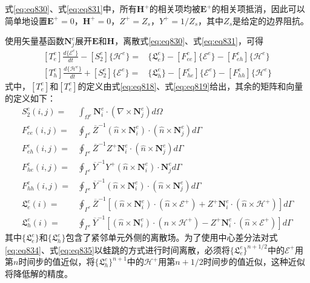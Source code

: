 \documentclass{article}
\numberwithin{equation}{section}
\renewcommand{\vec}[1]{\boldsymbol{#1}}
\begin{document}
式\ref{eq:eq830}、式\ref{eq:eq831}中，所有$\vec{\mathbf{H}}^+$的相关项均被$\vec{\mathbf{E}}^+$的相关项抵消，因此可以简单地设置$\vec{\mathbf{E}}^+=0$，$\vec{\mathbf{H}}^+=0$，$Z^+=Z_s$，$Y^+=1/Z_s$，其中$Z_s$是给定的边界阻抗。\par
使用矢量基函数$\mathbf{N}_j^e$展开$\vec{\mathbf{E}}$和$\vec{\mathbf{H}}$，离散式\ref{eq:eq830}、式\ref{eq:eq831}，可得
\begin{align}
    \label{eq:eq834}
    [T_e^e]\frac{d\{\mathcal{E}^e\}}{dt}-[S_2^e]\{\mathcal{H}^e\}=&\{\mathfrak{L}_e^e\}-[F^e_{ee}]\{\mathcal{E}^e\}-[F^e_{eh}]\{\mathcal{H}^e\} \\
    \label{eq:eq835}
    [T_h^e]\frac{d\{\mathcal{H}^e\}}{dt}+[S_2^e]\{\mathcal{E}^e\}=&\{\mathfrak{L}_h^e\}-[F^e_{he}]\{\mathcal{E}^e\}-[F^e_{hh}]\{\mathcal{H}^e\}
\end{align}
式中，$[T_e^e]$和$[T_e^e]$的定义由式\ref{eq:eq818}、式\ref{eq:eq819}给出，其余的矩阵和向量的定义如下：
\begin{align}
    \label{eq:eq836}
    S_2^e(i,j)=&\int_{\Omega^e}\mathbf{N}_i^e\cdot\left(\nabla\times\mathbf{N}_j^e\right)d\Omega \\
    \label{eq:eq837}
    F^e_{ee}(i,j)=&\oint_{\Gamma^e}\overline{Z}^{-1}(\hat{n}\times\mathbf{N}_i^e)\cdot(\hat{n}\times\mathbf{N}_j^e)d\Gamma \\
    \label{eq:eq838}
    F^e_{eh}(i,j)=&\oint_{\Gamma^e}\overline{Z}^{-1}Z^+\mathbf{N}_i^e\cdot(\hat{n}\times\mathbf{N}_j^e)d\Gamma \\
    \label{eq:eq839}
    F^e_{he}(i,j)=&\oint_{\Gamma^e}\overline{Y}^{-1}Y^+(\hat{n}\times\mathbf{N}_i^e)\cdot\mathbf{N}_j^ed\Gamma \\
    \label{eq:eq840}
    F^e_{hh}(i,j)=&\oint_{\Gamma^e}\overline{Y}^{-1}(\hat{n}\times\mathbf{N}_i^e)\cdot(\hat{n}\times\mathbf{N}_j^e)d\Gamma \\
    \label{eq:eq841}
    \mathfrak{L}_e^e(i)=&\oint_{\Gamma^e}\overline{Z}^{-1}[(\hat{n}\times\mathbf{N}_i^e)\cdot(\hat{n}\times\vec{\mathcal{E}}^+)+Z^+\mathbf{N}_i^e\cdot(\hat{n}\times\vec{\mathcal{H}}^+)]d\Gamma \\
    \label{eq:eq842}
    \mathfrak{L}_h^e(i)=&\oint_{\Gamma^e}\overline{Y}^{-1}[(\hat{n}\times\mathbf{N}_i^e)\cdot(\hat{n}\times\vec{\mathcal{H}}^+)-Z^+\mathbf{N}_i^e\cdot(\hat{n}\times\vec{\mathcal{E}}^+)]d\Gamma
\end{align}
其中$\{\mathfrak{L}_e^e\}$和$\{\mathfrak{L}_h^e\}$包含了紧邻单元外侧的离散场。为了使用中心差分法对式\ref{eq:eq834}、式\ref{eq:eq835}以蛙跳的方式进行时间离散，必须将$\{\mathfrak{L}_e^e\}^{n+1/2}$中的$\vec{\mathcal{E}}^+$用第$n$时间步的值近似，将$\{\mathfrak{L}_h^e\}^{n+1}$中的$\vec{\mathcal{H}}^+$用第$n+1/2$时间步的值近似，这种近似将降低解的精度。\par
\end{document}
